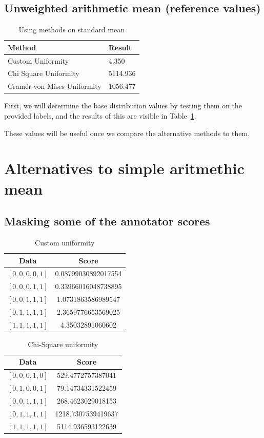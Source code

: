 \documentclass[10pt, a4paper]{article}
\begin{document}
\subsection{Unweighted arithmetic mean (reference values)}

\begin{table}
\caption{Using methods on standard mean}
\label{tab:t1}
\begin{center}
\begin{tabular}{ll}
\toprule
Method & Result \\
\midrule
Custom Uniformity & 4.350 \\
Chi Square Uniformity & 5114.936 \\
Cramér-von Mises Uniformity & 1056.477 \\
\bottomrule
\end{tabular}
\end{center}
\end{table}
First, we will determine the base distribution values by testing them on the provided labels, and the results of this are visible in Table~\ref{tab:t1}.

These values will be useful once we compare the alternative methods to them.

\section{Alternatives to simple aritmethic mean}
\subsection{Masking some of the annotator scores}
\begin{table}[ht]
\centering
\caption{Custom uniformity}
\begin{tabular}{|c|c|}
\hline
Data & Score \\
\hline
$[0, 0, 0, 0, 1]$ & 0.08799030892017554 \\
$[0, 0, 0, 1, 1]$ & 0.33966016048738895 \\
$[0, 0, 1, 1, 1]$ & 1.0731863586989547 \\
$[0, 1, 1, 1, 1]$ & 2.3659776653569025 \\
$[1, 1, 1, 1, 1]$ & 4.35032891060602 \\
\hline
\end{tabular}
\label{tab:custom-uniformity}
\end{table}

\begin{table}[ht]
\centering
\caption{Chi-Square uniformity}
\begin{tabular}{|c|c|}
\hline
Data & Score \\
\hline
$[0, 0, 0, 1, 0]$ & 529.4772757387041 \\
$[0, 1, 0, 0, 1]$ & 79.14734331522459 \\
$[0, 0, 1, 1, 1]$ & 268.4623029018153 \\
$[0, 1, 1, 1, 1]$ & 1218.7307539419637 \\
$[1, 1, 1, 1, 1]$ & 5114.936593122639 \\
\hline
\end{tabular}
\label{tab:chi-square-uniformity}
\end{table}
\end{document}
